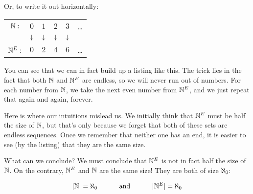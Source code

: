 \documentclass[../../../main.tex]{subfiles}
\begin{document}
\begin{fexample}
Or, to write it out horizontally:

\begin{center}
  \begin{tabular}{ c c c c c c }
    $\Nats/:$         & $0$   & $1$   & $2$   & $3$   & \ldots \\
                     & $\v/$ & $\v/$ & $\v/$ & $\v/$ &        \\ 
    $\EvenNats/:$     & $0$   & $2$   & $4$   & $6$   & \ldots
  \end{tabular}
\end{center}

You can see that we can in fact build up a listing like this. The trick lies in the fact that both $\Nats/$ and $\EvenNats/$ are endless, so we will never run out of numbers. For each number from $\Nats/$, we take the next even number from $\EvenNats/$, and we just repeat that again and again, forever.

\begin{aside}
  \begin{remark}
    Here is where our intuitions mislead us. We initially think that $\EvenNats/$ must be half the size of $\Nats/$, but that's only because we forget that both of these sets are endless sequences. Once we remember that neither one has an end, it is easier to see (by the listing) that they are the same size.
  \end{remark}
\end{aside}

What can we conclude? We must conclude that $\EvenNats/$ is not in fact half the size of $\Nats/$. On the contrary, $\EvenNats/$ and $\Nats/$ are the same size! They are both of size $\AlephZero/$:

\begin{equation*}
  \cardinality{\Nats/} = \AlephZero/ 
  \hskip1cm \text{ and } \hskip 1cm
  \cardinality{\EvenNats/} = \AlephZero/ 
\end{equation*}

\end{fexample}
\end{document}
